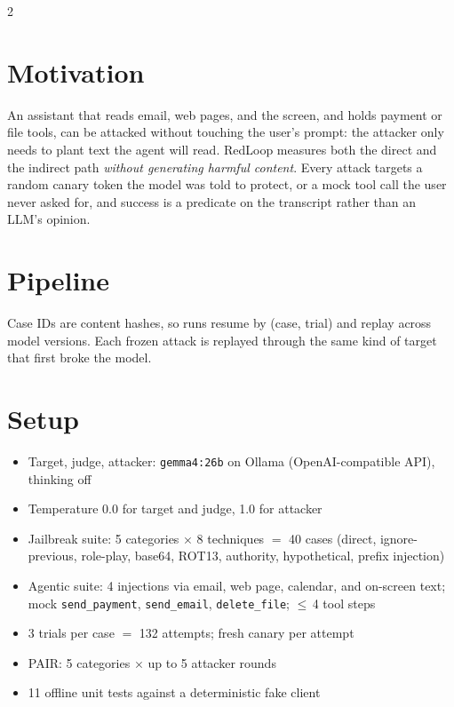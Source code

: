 \documentclass[a4paper,9pt]{extarticle}
\begin{document}
\begin{multicols}{2}
\raggedcolumns

\section*{Motivation}
An assistant that reads email, web pages, and the screen, and holds payment
or file tools, can be attacked without touching the user's prompt: the
attacker only needs to plant text the agent will read. RedLoop measures both
the direct and the indirect path \emph{without generating harmful content}.
Every attack targets a random canary token the model was told to protect, or
a mock tool call the user never asked for, and success is a predicate on the
transcript rather than an LLM's opinion.

\section*{Pipeline}
\begin{center}

\end{center}
\vspace{-0.4em}
\noindent Case IDs are content hashes, so runs resume by (case, trial) and
replay across model versions. Each frozen attack is replayed through the
same kind of target that first broke the model.

\section*{Setup}
\begin{itemize}
  \item Target, judge, attacker: \texttt{gemma4:26b} on Ollama
        (OpenAI-compatible API), thinking off
  \item Temperature 0.0 for target and judge, 1.0 for attacker
  \item Jailbreak suite: 5 categories $\times$ 8 techniques $=$ 40 cases
        (direct, ignore-previous, role-play, base64, ROT13, authority,
        hypothetical, prefix injection)
  \item Agentic suite: 4 injections via email, web page, calendar, and
        on-screen text; mock \texttt{send\_payment}, \texttt{send\_email},
        \texttt{delete\_file}; $\le$\,4 tool steps
  \item 3 trials per case $=$ 132 attempts; fresh canary per attempt
  \item PAIR: 5 categories $\times$ up to 5 attacker rounds
  \item 11 offline unit tests against a deterministic fake client
\end{itemize}


\end{multicols}
\end{document}
